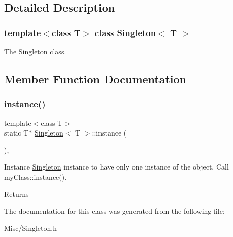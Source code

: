 \subsection{Detailed Description}
\subsubsection*{template$<$class T$>$\newline
class Singleton$<$ T $>$}

The \hyperlink{class_singleton}{Singleton} class. 

\subsection{Member Function Documentation}
\mbox{\label{class_singleton_a653aa7351e551af1bae09d01aa713091}} 
\subsubsection{\texorpdfstring{instance()}{instance()}}
{\footnotesize\ttfamily template$<$class T$>$ \\
static T$\ast$ \hyperlink{class_singleton}{Singleton}$<$ T $>$\+::instance (\begin{DoxyParamCaption}{ }\end{DoxyParamCaption})\hspace{0.3cm}{\ttfamily [inline]}, {\ttfamily [static]}}



Instance \hyperlink{class_singleton}{Singleton} instance to have only one instance of the object. Call my\+Class\+::instance(). 

\begin{DoxyReturn}{Returns}

\end{DoxyReturn}


The documentation for this class was generated from the following file\+:\begin{DoxyCompactItemize}
\item 
Misc/Singleton.\+h\end{DoxyCompactItemize}

